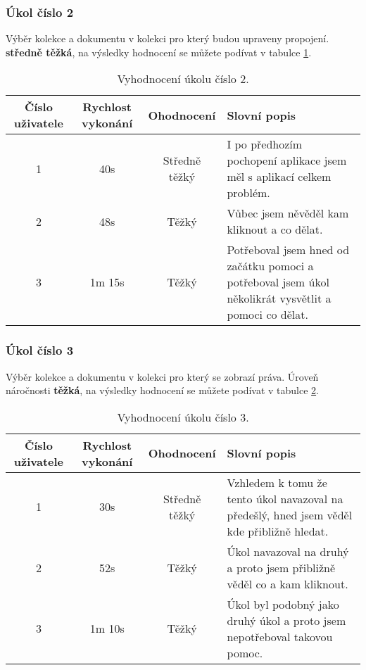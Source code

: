 \subsubsection{Úkol číslo 2} Výběr kolekce a dokumentu v kolekci pro který budou upraveny propojení. \textbf{středně těžká}, na výsledky hodnocení se můžete podívat v tabulce \ref{ukol-2}.
\begin{table}[htp]
\begin{center}
\begin{tabular}{ || c || c | c | m{5cm} || } 
\hline
Číslo uživatele & Rychlost vykonání & Ohodnocení & Slovní popis \\ [0.5ex] 
\hline
\hline
1 & 40s & Středně těžký & I po předhozím pochopení aplikace jsem měl s aplikací celkem problém.\\ 
\hline
2 & 48s & Těžký & Vůbec jsem něvěděl kam kliknout a co dělat. \\
\hline
3 & 1m 15s & Těžký & Potřeboval jsem hned od začátku pomoci a potřeboval jsem úkol několikrát vysvětlit a pomoci co dělat. \\
\hline
\end{tabular}
\end{center}
\caption{Vyhodnocení úkolu číslo 2.}
\label{ukol-2}
\end{table}
\subsubsection{Úkol číslo 3} Výběr kolekce a dokumentu v kolekci pro který se zobrazí práva. Úroveň náročnosti \textbf{těžká}, na výsledky hodnocení se můžete podívat v tabulce \ref{ukol-3}.
\begin{table}[htp]
\begin{center}
\begin{tabular}{ || c || c | c | m{5cm} || } 
\hline
Číslo uživatele & Rychlost vykonání & Ohodnocení & Slovní popis \\ [0.5ex] 
\hline
\hline
1 & 30s & Středně těžký & Vzhledem k tomu že tento úkol navazoval na předešlý, hned jsem věděl kde přibližně hledat. \\ 
\hline
2 & 52s & Těžký & Úkol navazoval na druhý a proto jsem přibližně věděl co a kam kliknout. \\
\hline
3 & 1m 10s & Těžký & Úkol byl podobný jako druhý úkol a proto jsem nepotřeboval takovou pomoc. \\
\hline
\end{tabular}
\end{center}
\caption{Vyhodnocení úkolu číslo 3.}
\label{ukol-3}
\end{table}

